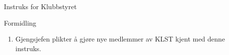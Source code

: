 \begin{instruks*}{Instruks for Klubbstyret}
    \begin{instruksledd}{Formidling}
        \begin{enumerate}
            \item Gjengsjefen plikter å gjøre nye medlemmer av KLST kjent med denne instruks.
        \end{enumerate}
    \end{instruksledd}


\end{instruks*}


